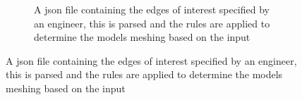 \begin{changemargin}{\CMwidth}{\CMheight}
\begin{figure}[!h]
\begin{subfigure}{.5\textwidth}
  \caption{A json file containing the edges of interest specified by an engineer, this is parsed and the rules are applied to determine the models meshing based on the input}
  \label{fig:sub2}
\end{subfigure}
\label{fig:test}
\end{figure}



\end{changemargin}
